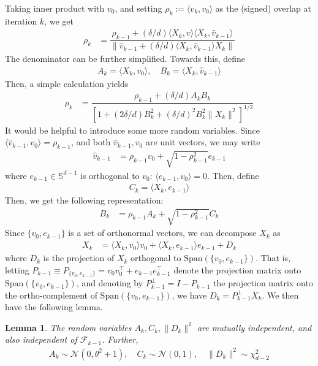 \documentclass[12pt]{article}
\newtheorem{lemma}[theorem]{Lemma}      %
\def\gF{{\mathcal{F}}}
\def\gN{{\mathcal{N}}}
\def\sS{{\mathbb{S}}}
\begin{document}
\medskip

Taking inner product with $v_0$, and setting $\rho_k:=\langle v_k,v_0\rangle$ as the (signed) overlap at iteration $k$, we get
\begin{align}\label{eq:recursion_rho}
    \rho_k &= \dfrac{\rho_{k-1}+(\delta/d)\langle X_k,v\rangle \langle X_k,\hat v_{k-1}\rangle}{\|\hat v_{k-1}+(\delta/d)\langle X_k,\hat v_{k-1}\rangle X_k\|}
\end{align}The denominator can be further simplified. Towards this, define
\begin{align*}
    A_k = \langle X_k,v_0\rangle, \quad B_k =\langle X_k,\hat v_{k-1}\rangle
\end{align*}Then, a simple calculation yields
\begin{align}\label{eqn:recursion_ABC}
    \rho_k &= \dfrac{\rho_{k-1} + (\delta/d)A_kB_k}{[1 + (2\delta/d)B_k^2 + (\delta/d)^2B_k^2\|X_k\|^2]^{1/2}}
\end{align}
It would be helpful to introduce some more random variables. Since $\langle \hat v_{k-1},v_0\rangle=\rho_{k-1}$, and both $\hat v_{k-1},v_0$ are unit vectors, we may write
\begin{align*}
    \hat v_{k-1} &= \rho_{k-1}v_0 + \sqrt{1-\rho^2_{k-1}}e_{k-1}
\end{align*}where $e_{k-1}\in\sS^{d-1}$ is orthogonal to $v_0$: $\langle e_{k-1}, v_0\rangle = 0$. Then, define
\begin{align*}
    C_k = \langle X_k,e_{k-1}\rangle
\end{align*}Then, we get the following representation:
\begin{align*}
    B_k &= \rho_{k-1}A_k + \sqrt{1-\rho^2_{k-1}}C_k
\end{align*}
 \medskip
Since $\{v_0,e_{k-1}\}$ is a set of orthonormal vectors, we can decompose $X_k$ as
\begin{align*}
    X_k &= \langle X_k,v_0\rangle v_0 + \langle X_k, e_{k-1}\rangle e_{k-1} + D_k
\end{align*}where $D_k$ is the projection of $X_k$ orthogonal to $\text{Span}(\{v_0,e_{k-1}\})$. That is, letting $P_{k-1}\equiv P_{\{v_0,e_{k-1}\}}=v_0v_0^\top + e_{k-1}e_{k-1}^\top$ denote the projection matrix onto $\text{Span}(\{v_0,e_{k-1}\})$, and denoting by $P_{k-1}^\perp=I-P_{k-1}$ the projection matrix onto the ortho-complement of $\text{Span}(\{v_0,e_{k-1}\})$, we have $D_k=P_{k-1}^\perp X_k$. We then have the following lemma.

\begin{lemma}\label{lemma:Xk_components_indep}
The random variables $A_k, C_k, \|D_k\|^2$ are mutually independent, and also independent of $\gF_{k-1}$. Further,
\begin{align*}
    A_k\sim \gN(0,\theta^2+1), \quad C_k\sim \gN(0,1),\quad \|D_k\|^2\sim \chi^2_{d-2}
\end{align*}
\end{lemma}
\end{document}
